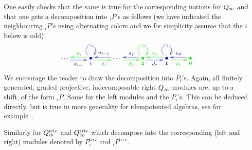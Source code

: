 \begin{ex}\label{ex-decomp}
One easily checks that the same is true for 
the corresponding notions for $Q_{\infty}$ and 
that one gets a decomposition into ${}_iP$'s as 
follows (we have indicated the neighbouring ${}_iP$'s 
using alternating colors and we for simplicity assume that the $i$ below is odd)
\[
\xymatrix{
   \cdots\ar@[blue]@<-2pt>[r]_/+0.2em/{{\color{blue}d_{i+1}}} &  {\color{blue}\raisebox{0.1cm}{\xy(0,0)*{\bullet};(0,-2.5)*{\scriptstyle \bbi};\endxy}} \ar@[blue]@(ul,ur)|{{\color{blue}\varepsilon_i}} \ar@[green]@<-2pt>[l]_/-0.2em/{{\color{green}u_{i}}}\ar@[green]@<-2pt>[r]_{{\color{green}d_{i}}} & \cdots \ar@[blue]@<-2pt>[l]_{{\color{blue}u_{i-1}}}\ar@[green]@<-2pt>[r]_/+0.2em/{{\color{green}d_{3}}} & {\color{green}\raisebox{0.1cm}{\xy(0,0)*{\bullet};(0,-2.5)*{\scriptstyle \bbt};\endxy}} \ar@[green]@(ul,ur)|{{\color{green}\varepsilon_2}} \ar@[blue]@<-2pt>[l]_/-0.2em/{{\color{blue}u_{2}}}\ar@[blue]@<-2pt>[r]_{{\color{blue}d_{2}}} & {\color{blue}\raisebox{0.1cm}{\xy(0,0)*{\bullet};(0,-2.5)*{\scriptstyle \bbo};\endxy}} \ar@[blue]@(ul,ur)|{{\color{blue}\varepsilon_1}} \ar@[green]@<-2pt>[l]_{{\color{green}u_{1}}}\ar@[green]@<-2pt>[r]_{{\color{green}d_{1}}} & {\color{green}\raisebox{0.1cm}{\xy(0,0)*{\bullet};(0,-2.5)*{\scriptstyle \bbz};\endxy}} \ar@[blue]@<-2pt>[l]_{{\color{blue}u_0}}\\
}
\]
We encourage the reader to draw the 
decomposition into $P_i$'s. Again, all 
finitely generated, graded projective, 
indecomposable right $Q_{\infty}$-modules are, up 
to a shift, of the form ${}_iP$. Same for 
the left modules and the $P_i$'s. This can 
be deduced directly, but is 
true in more generality for idempotented 
algebras, see for example~\cite[Proposition~5.3.1]{klms}.
\end{ex}



Similarly for $Q_m^{\mathrm{triv}}$ and $Q_{\infty}^{\mathrm{triv}}$ which decompose into the 
corresponding (left and right) modules denoted 
by $P_i^{\mathrm{triv}}$ and ${}_iP^{\mathrm{triv}}$.




